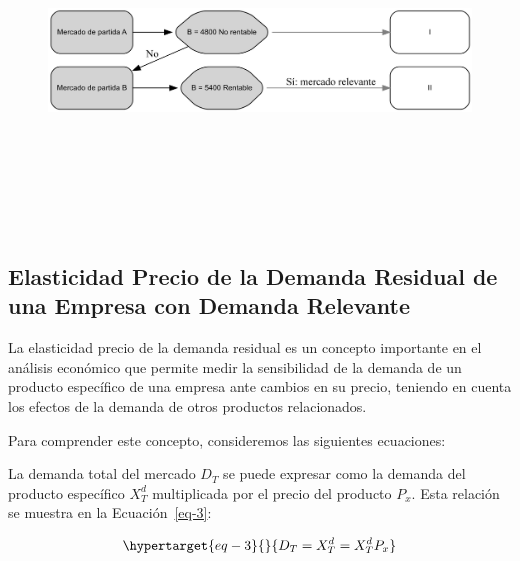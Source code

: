 \documentclass[
  a4paper,
]{article}
\theoremstyle{definition}
\theoremstyle{remark}
\begin{document}
\begin{figure}[H]

{\centering \includegraphics[width=5.5in,height=3.5in]{index_files/figure-latex/dot-figure-2.png}

}

\end{figure}

\hypertarget{elasticidad-precio-de-la-demanda-residual-de-una-empresa-con-demanda-relevante}{%
\subsection{Elasticidad Precio de la Demanda Residual de una Empresa con
Demanda
Relevante}\label{elasticidad-precio-de-la-demanda-residual-de-una-empresa-con-demanda-relevante}}

La elasticidad precio de la demanda residual es un concepto importante
en el análisis económico que permite medir la sensibilidad de la demanda
de un producto específico de una empresa ante cambios en su precio,
teniendo en cuenta los efectos de la demanda de otros productos
relacionados.

Para comprender este concepto, consideremos las siguientes ecuaciones:

La demanda total del mercado \(D_T\) se puede expresar como la demanda
del producto específico \(X_T^d\) multiplicada por el precio del
producto \(P_x\). Esta relación se muestra en la Ecuación~\ref{eq-3}:

\begin{equation}\protect\hypertarget{eq-3}{}{
D_T = X_{T}^{d} = X_{T}^{d} P_{x}
}\label{eq-3}\end{equation}
\end{document}
